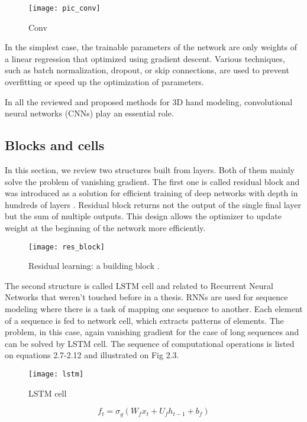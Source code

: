 \begin{figure}
\caption{Conv}
\centering
\texttt{[image: pic\_conv]}
\end{figure}

In the simplest case, the trainable parameters of the network are only weights of a linear regression that optimized using gradient descent. Various techniques, such as batch normalization, dropout, or skip connections, are used to prevent overfitting or speed up the optimization of parameters.

In all the reviewed and proposed methods for 3D hand modeling, convolutional neural networks (CNNs) play an essential role.

\subsection{Blocks and cells}

In this section, we review two structures built from layers. Both of them mainly solve the problem of vanishing gradient. The first one is called residual block and was introduced as a solution for efficient training of deep networks with depth in hundreds of layers \cite{24} . Residual block returns not the output of the single final layer but the sum of multiple outputs. This design allows the optimizer to update weight at the beginning of the network more efficiently.

\begin{figure}
\caption{Residual learning: a building block \cite{24}.}
\centering
\texttt{[image: res\_block]}
\end{figure}


The second structure is called LSTM cell and related to Recurrent Neural Networks that weren’t touched before in a thesis. RNNs are used for sequence modeling where there is a task of mapping one sequence to another. Each element of a sequence is fed to network cell, which extracts patterns of elements. The problem, in this case, again vanishing gradient for the case of long sequences and can be solved by LSTM cell. The sequence of computational operations is listed on equations 2.7-2.12 and illustrated on Fig 2.3.

\begin{figure}[h]
\caption{LSTM cell}
\texttt{[image: lstm]}
\end{figure}


\begin{equation}
f_t = \sigma_g(W_fx_t + U_fh_{t-1} + b_f)
\end{equation}


